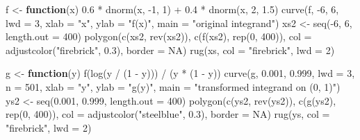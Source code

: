 \documentclass[
  letterpaper,
  DIV=11,
  numbers=noendperiod]{scrreprt}
\newenvironment{Shaded}{\begin{snugshade}}{\end{snugshade}}
\newcommand{\AttributeTok}[1]{\textcolor[rgb]{0.40,0.45,0.13}{#1}}
\newcommand{\ConstantTok}[1]{\textcolor[rgb]{0.56,0.35,0.01}{#1}}
\newcommand{\ControlFlowTok}[1]{\textcolor[rgb]{0.00,0.23,0.31}{\textbf{#1}}}
\newcommand{\DecValTok}[1]{\textcolor[rgb]{0.68,0.00,0.00}{#1}}
\newcommand{\FloatTok}[1]{\textcolor[rgb]{0.68,0.00,0.00}{#1}}
\newcommand{\FunctionTok}[1]{\textcolor[rgb]{0.28,0.35,0.67}{#1}}
\newcommand{\NormalTok}[1]{\textcolor[rgb]{0.00,0.23,0.31}{#1}}
\newcommand{\OtherTok}[1]{\textcolor[rgb]{0.00,0.23,0.31}{#1}}
\newcommand{\SpecialCharTok}[1]{\textcolor[rgb]{0.37,0.37,0.37}{#1}}
\newcommand{\StringTok}[1]{\textcolor[rgb]{0.13,0.47,0.30}{#1}}
\begin{document}
\begin{Shaded}
\begin{Highlighting}[]
\NormalTok{f }\OtherTok{\textless{}{-}} \ControlFlowTok{function}\NormalTok{(x) }\FloatTok{0.6} \SpecialCharTok{*} \FunctionTok{dnorm}\NormalTok{(x, }\SpecialCharTok{{-}}\DecValTok{1}\NormalTok{, }\DecValTok{1}\NormalTok{) }\SpecialCharTok{+} \FloatTok{0.4} \SpecialCharTok{*} \FunctionTok{dnorm}\NormalTok{(x, }\DecValTok{2}\NormalTok{, }\FloatTok{1.5}\NormalTok{)}
\FunctionTok{curve}\NormalTok{(f, }\SpecialCharTok{{-}}\DecValTok{6}\NormalTok{, }\DecValTok{6}\NormalTok{, }\AttributeTok{lwd =} \DecValTok{3}\NormalTok{, }\AttributeTok{xlab =} \StringTok{"x"}\NormalTok{, }\AttributeTok{ylab =} \StringTok{"f(x)"}\NormalTok{, }\AttributeTok{main =} \StringTok{"original integrand"}\NormalTok{)}
\NormalTok{xs2 }\OtherTok{\textless{}{-}} \FunctionTok{seq}\NormalTok{(}\SpecialCharTok{{-}}\DecValTok{6}\NormalTok{, }\DecValTok{6}\NormalTok{, }\AttributeTok{length.out =} \DecValTok{400}\NormalTok{)}
\FunctionTok{polygon}\NormalTok{(}\FunctionTok{c}\NormalTok{(xs2, }\FunctionTok{rev}\NormalTok{(xs2)), }\FunctionTok{c}\NormalTok{(}\FunctionTok{f}\NormalTok{(xs2), }\FunctionTok{rep}\NormalTok{(}\DecValTok{0}\NormalTok{, }\DecValTok{400}\NormalTok{)), }\AttributeTok{col =} \FunctionTok{adjustcolor}\NormalTok{(}\StringTok{"firebrick"}\NormalTok{, }\FloatTok{0.3}\NormalTok{), }\AttributeTok{border =} \ConstantTok{NA}\NormalTok{)}
\FunctionTok{rug}\NormalTok{(xs, }\AttributeTok{col =} \StringTok{"firebrick"}\NormalTok{, }\AttributeTok{lwd =} \DecValTok{2}\NormalTok{)}

\NormalTok{g }\OtherTok{\textless{}{-}} \ControlFlowTok{function}\NormalTok{(y) }\FunctionTok{f}\NormalTok{(}\FunctionTok{log}\NormalTok{(y }\SpecialCharTok{/}\NormalTok{ (}\DecValTok{1} \SpecialCharTok{{-}}\NormalTok{ y))) }\SpecialCharTok{/}\NormalTok{ (y }\SpecialCharTok{*}\NormalTok{ (}\DecValTok{1} \SpecialCharTok{{-}}\NormalTok{ y))}
\FunctionTok{curve}\NormalTok{(g, }\FloatTok{0.001}\NormalTok{, }\FloatTok{0.999}\NormalTok{, }\AttributeTok{lwd =} \DecValTok{3}\NormalTok{, }\AttributeTok{n =} \DecValTok{501}\NormalTok{, }\AttributeTok{xlab =} \StringTok{"y"}\NormalTok{, }\AttributeTok{ylab =} \StringTok{"g(y)"}\NormalTok{,}
      \AttributeTok{main =} \StringTok{"transformed integrand on (0, 1)"}\NormalTok{)}
\NormalTok{ys2 }\OtherTok{\textless{}{-}} \FunctionTok{seq}\NormalTok{(}\FloatTok{0.001}\NormalTok{, }\FloatTok{0.999}\NormalTok{, }\AttributeTok{length.out =} \DecValTok{400}\NormalTok{)}
\FunctionTok{polygon}\NormalTok{(}\FunctionTok{c}\NormalTok{(ys2, }\FunctionTok{rev}\NormalTok{(ys2)), }\FunctionTok{c}\NormalTok{(}\FunctionTok{g}\NormalTok{(ys2), }\FunctionTok{rep}\NormalTok{(}\DecValTok{0}\NormalTok{, }\DecValTok{400}\NormalTok{)), }\AttributeTok{col =} \FunctionTok{adjustcolor}\NormalTok{(}\StringTok{"steelblue"}\NormalTok{, }\FloatTok{0.3}\NormalTok{), }\AttributeTok{border =} \ConstantTok{NA}\NormalTok{)}
\FunctionTok{rug}\NormalTok{(ys, }\AttributeTok{col =} \StringTok{"firebrick"}\NormalTok{, }\AttributeTok{lwd =} \DecValTok{2}\NormalTok{)}
\end{Highlighting}
\end{Shaded}
\end{document}
